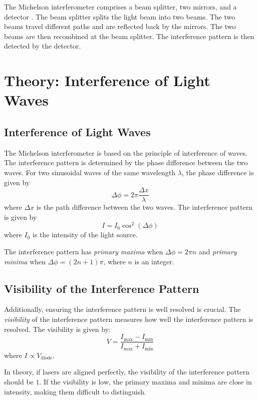The Michelson interferometer comprises a beam splitter, two mirrors, and a detector \cite{MichelsonMorley1887,MITOpticalInterferometry2023}. The beam splitter splits the light beam into two beams. The two beams travel different paths and are reflected back by the mirrors. The two beams are then recombined at the beam splitter. The interference pattern is then detected by the detector. 

\section{Theory: Interference of Light Waves}
\subsection{Interference of Light Waves}
The Michelson interferometer is based on the principle of interference of waves. The interference pattern is determined by the phase difference between the two waves. For two sinusoidal waves of the same wavelength $\lambda$, the phase difference is given by
\begin{equation}
\Delta \phi = 2\pi \frac{\Delta x}{\lambda}
\end{equation}
where $\Delta x$ is the path difference between the two waves. The interference pattern is given by
\begin{equation}
    I = I_0 \cos^2(\Delta \phi)
\end{equation}
where $I_0$ is the intensity of the light source.

The interference pattern has \textit{primary maxima} when $\Delta \phi = 2\pi n$ and \textit{primary minima} when $\Delta \phi = (2n+1)\pi$, where $n$ is an integer. 

\subsection{Visibility of the Interference Pattern}

Additionally, ensuring the interference pattern is well resolved is crucial. The \textit{visibility} of the interference pattern measures how well the interference pattern is resolved. The visibility is given by:
\begin{equation}
    V = \frac{I_{\text{max}} - I_{\text{min}}}{I_{\text{max}} + I_{\text{min}}}
\end{equation}
where $I \propto V_{\text{diode}}$. 

In theory, if lasers are aligned perfectly, the visibility of the interference pattern should be $1$. If the visibility is low, the primary maxima and minima are close in intensity, making them difficult to distinguish. 

